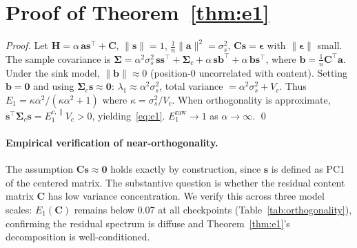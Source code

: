 \documentclass[11pt]{article}
\begin{document}
\section{Proof of Theorem~\ref{thm:e1}}\label{app:proof}

\begin{proof}
Let $\mathbf{H} = \alpha\,\mathbf{a}\mathbf{s}^\top + \mathbf{C}$, $\|\mathbf{s}\| = 1$, $\frac{1}{n}\|\mathbf{a}\|^2 = \sigma_s^2$, $\mathbf{C}\mathbf{s} = \boldsymbol{\epsilon}$ with $\|\boldsymbol{\epsilon}\|$ small.
The sample covariance is
$\boldsymbol{\Sigma} = \alpha^2\sigma_s^2\,\mathbf{s}\mathbf{s}^\top + \boldsymbol{\Sigma}_c + \alpha\,\mathbf{s}\mathbf{b}^\top + \alpha\,\mathbf{b}\mathbf{s}^\top$,
where $\mathbf{b} = \frac{1}{n}\mathbf{C}^\top\mathbf{a}$.
Under the sink model, $\|\mathbf{b}\| \approx 0$ (position-0 uncorrelated with content).
Setting $\mathbf{b} = \mathbf{0}$ and using $\boldsymbol{\Sigma}_c\mathbf{s} \approx \mathbf{0}$:
$\lambda_1 \approx \alpha^2\sigma_s^2$, total variance $= \alpha^2\sigma_s^2 + V_c$.
Thus $E_1 = \kappa\alpha^2/(\kappa\alpha^2 + 1)$ where $\kappa = \sigma_s^2/V_c$.
When orthogonality is approximate, $\mathbf{s}^\top\boldsymbol{\Sigma}_c\mathbf{s} = E_1^{c,\parallel}V_c > 0$, yielding~\eqref{eq:e1}.
$E_1^{\text{raw}} \to 1$ as $\alpha \to \infty$. \qed
\end{proof}

\paragraph{Empirical verification of near-orthogonality.}
The assumption $\mathbf{C}\mathbf{s} \approx \mathbf{0}$ holds exactly by construction, since $\mathbf{s}$ is defined as PC1 of the centered matrix.
The substantive question is whether the residual content matrix $\mathbf{C}$ has low variance concentration.
We verify this across three model scales: $E_1(\mathbf{C})$ remains below 0.07 at all checkpoints (Table~\ref{tab:orthogonality}), confirming the residual spectrum is diffuse and Theorem~\ref{thm:e1}'s decomposition is well-conditioned.
\end{document}
